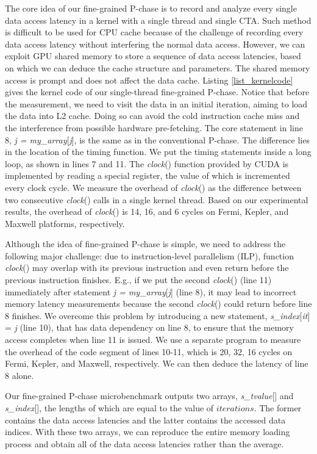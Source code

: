 \documentclass[10pt,journal,compsoc]{IEEEtran}
\theoremstyle{definition}
\begin{document}
The core idea of our fine-grained P-chase is to record and analyze every single data access latency in a kernel with a single thread and single CTA. Such method is difficult to be used for CPU cache because of the challenge of recording every data access latency without interfering the normal data access. However, we can exploit GPU shared memory to store a sequence of data access latencies, based on which we can deduce the cache structure and parameters. The shared memory access is prompt and does not affect the data cache. Listing \ref{list_kernelcode} gives the kernel code of our single-thread fine-grained P-chase. Notice that before the measurement, we need to visit the data in an initial iteration, aiming to load the data into L2 cache. Doing so can avoid the cold instruction cache miss and the interference from possible hardware pre-fetching. The core statement in line 8, \emph{j = my\_array}[\emph{j}], is the same as in the conventional P-chase. The difference lies in the location of the timing function. We put the timing statements inside a long loop, as shown in lines 7 and 11. The \emph{clock}() function provided by CUDA is implemented by reading a special register, the value of which is incremented every clock cycle. We measure the overhead of \emph{clock}() as the difference between two consecutive \emph{clock}() calls in a single kernel thread. Based on our experimental results, the overhead of \emph{clock}() is 14, 16, and 6 cycles on Fermi, Kepler, and Maxwell platforms, respectively.

Although the idea of fine-grained P-chase is simple, we need to address the following major challenge: due to instruction-level parallelism (ILP), function \emph{clock}() may overlap with its previous instruction and even return before the previous instruction finishes. E.g., if we put the second \emph{clock}() (line 11) immediately after statement \emph{j = my\_array}[\emph{j}] (line 8), it may lead to incorrect memory latency measurements because the second \emph{clock}() could return before line 8 finishes. We overcome this problem by introducing a new statement, \emph{s\_index}[\emph{it}] = \emph{j} (line 10), that has data dependency on line 8, to ensure that the memory access completes when line 11 is issued. We use a separate program to measure the overhead of the code segment of lines 10-11, which is 20, 32, 16 cycles on Fermi, Kepler, and Maxwell, respectively. We can then deduce the latency of line 8 alone.

Our fine-grained P-chase microbenchmark outputs two arrays, \emph{s\_tvalue}[] and \emph{s\_index}[], the lengths of which are equal to the value of $iterations$. The former contains the data access latencies and the latter contains the accessed data indices. With these two arrays, we can reproduce the entire memory loading process and obtain all of the data access latencies rather than the average.
\end{document}
